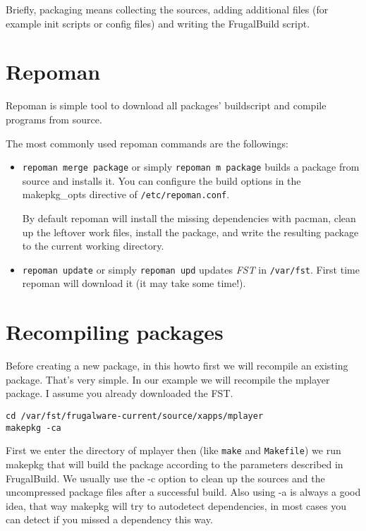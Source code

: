 Briefly, packaging means collecting the sources, adding additional files (for example init scripts or config files) and writing the FrugalBuild script.

\section{Repoman}

Repoman is simple tool to download all packages' buildscript and compile programs from source.

The most commonly used repoman commands are the followings:
\begin{itemize}
\item {\tt repoman merge package} or simply {\tt repoman m package} builds a
package from source and installs it. You can configure the build options in the
makepkg_opts directive of {\tt /etc/repoman.conf}.

By default repoman will install the missing dependencies with pacman, clean up
the leftover work files, install the package, and write the resulting package
to the current working  directory.

\item {\tt repoman update} or simply {\tt repoman upd} updates \textit{FST} in
{\tt /var/fst}. First time repoman will download it (it may take some time!).
\end{itemize}

\section{Recompiling packages}

Before creating a new package, in this howto first we will recompile an existing package. That's very simple. In our example we will recompile the mplayer package. I assume you already downloaded the FST.

\begin {verbatim}
cd /var/fst/frugalware-current/source/xapps/mplayer
makepkg -ca
\end{verbatim}

First we enter the directory of mplayer then (like {\tt make} and
{\tt Makefile}) we run makepkg that will build the package according to the
parameters described in FrugalBuild. We usually use the -c option to clean up
the sources and the uncompressed package files after a successful build. Also
using -a is always a good idea, that way makepkg will try to autodetect
dependencies, in most cases you can detect if you missed a dependency this way.

